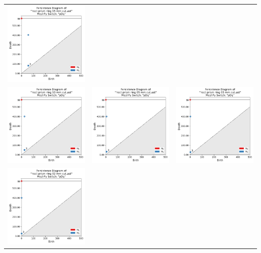 \documentclass[ma]{uncgdissertationexp}
\theoremstyle{plain}
\theoremstyle{definition}
\theoremstyle{remark}
\begin{document}
\begin{table}[H]
\begin{center}
\begin{tabular}{ccc}
         \includegraphics[width=1.875in]{Final Run, (rect prism ring 15 mm cut) persdia.png} \\
         \includegraphics[width=1.875in]{Final Run, (rect prism ring 10 mm cut) persdia.png} & 
         \includegraphics[width=1.875in]{Final Run, (rect prism ring 05 mm cut) persdia.png} & 
         \includegraphics[width=1.875in]{Final Run, (rect prism ring 03 mm cut) persdia.png} \\
         \includegraphics[width=1.875in]{Final Run, (rect prism ring 02 mm cut) persdia.png} &

\end{tabular}
\end{center}
\end{table}
\end{document}
